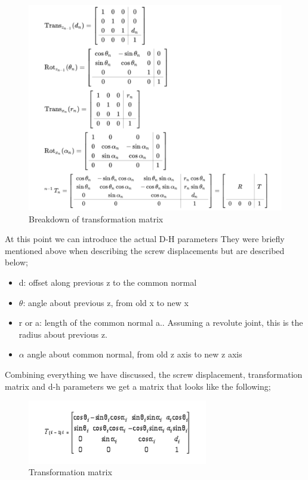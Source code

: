             \begin{figure}[H]
                \centering
                \includegraphics[width=150mm]{Transformation.PNG}
                \caption{Breakdown of transformation matrix}
                \label{fig:TransformationMatrixBreakdown}
            \end{figure}
            At this point we can introduce the actual D-H parameters They were briefly mentioned above when describing the screw displacements but are described below;
            \begin{itemize}
                \item d: offset along previous  z to the common normal
                \item $\theta$: angle about previous z, from old x to new x
                \item r or a: length of the common normal a.. Assuming a revolute joint, this is the radius about previous z.
                \item $\alpha$ angle about common normal, from old z axis to new z axis
            \end{itemize}
            Combining everything we have discussed, the screw displacement, transformation matrix and d-h parameters we get a matrix that looks like the following;
            \begin{figure}[H]
                \centering
                \includegraphics[width=0.7\textwidth]{Matrizx.PNG}
                \caption{Transformation matrix}
                \label{fig:TransformationMatrix}
            \end{figure}
